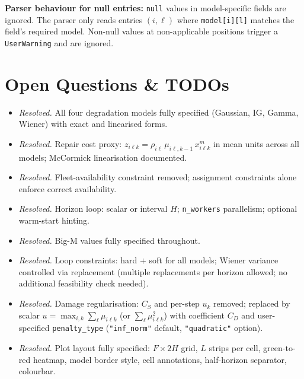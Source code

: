 \documentclass[11pt,a4paper]{article}
\begin{document}
\textbf{Parser behaviour for null entries:} \texttt{null} values in model-specific
fields are ignored. The parser only reads entries $(i,\ell)$ where
\texttt{model[i][l]} matches the field's required model. Non-null values at
non-applicable positions trigger a \texttt{UserWarning} and are ignored.

\section{Open Questions \& TODOs}

\begin{itemize}[leftmargin=1.5em]
  \item[\checkmark] \textit{Resolved.} All four degradation models fully specified
        (Gaussian, IG, Gamma, Wiener) with exact and linearised forms.
  \item[\checkmark] \textit{Resolved.} Repair cost proxy: $z_{i\ell k} = \rho_{i\ell}\,\mu_{i\ell,k-1}\,x^m_{i\ell k}$
        in mean units across all models; McCormick linearisation documented.
  \item[\checkmark] \textit{Resolved.} Fleet-availability constraint removed;
        assignment constraints alone enforce correct availability.
  \item[\checkmark] \textit{Resolved.} Horizon loop: scalar or interval $H$;
        \texttt{n\_workers} parallelism; optional warm-start hinting.
  \item[\checkmark] \textit{Resolved.} Big-M values fully specified throughout.
  \item[\checkmark] \textit{Resolved.} Loop constraints: hard $+$ soft for all models;
        Wiener variance controlled via replacement (multiple replacements per horizon
        allowed; no additional feasibility check needed).
  \item[\checkmark] \textit{Resolved.} Damage regularisation: $C_S$ and per-step $u_k$
        removed; replaced by scalar $u = \max_{i,k}\sum_\ell \mu_{i\ell k}$
        (or $\sum_\ell \mu_{i\ell k}^2$) with coefficient $C_D$ and user-specified
        \texttt{penalty\_type} (\texttt{"inf\_norm"} default, \texttt{"quadratic"} option).
  \item[\checkmark] \textit{Resolved.} Plot layout fully specified: $F \times 2H$ grid,
        $L$ strips per cell, green-to-red heatmap, model border style, cell annotations,
        half-horizon separator, colourbar.

\end{itemize}
\end{document}
